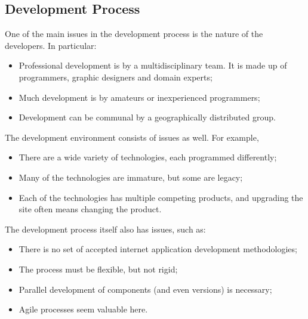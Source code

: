\documentclass[a4paper, openany]{memoir}
\begin{document}
\subsection{Development Process}
One of the main issues in the development process is the nature of the developers. In particular:
\begin{itemize}
    \item Professional development is by a multidisciplinary team. It is made up of programmers, graphic designers and domain experts;
    \item Much development is by amateurs or inexperienced programmers;
    \item Development can be communal by a geographically distributed group.
\end{itemize}
The development environment consists of issues as well. For example,
\begin{itemize}
    \item There are a wide variety of technologies, each programmed differently;
    \item Many of the technologies are immature, but some are legacy;
    \item Each of the technologies has multiple competing products, and upgrading the site often means changing the product.
\end{itemize}
The development process itself also has issues, such as:
\begin{itemize}
    \item There is no set of accepted internet application development methodologies;
    \item The process must be flexible, but not rigid;
    \item Parallel development of components (and even versions) is necessary;
    \item Agile processes seem valuable here.
\end{itemize}
\end{document}
